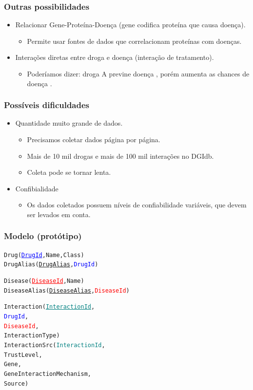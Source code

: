 \documentclass[12pt]{beamer}
\begin{document}
\begin{frame}
  \frametitle{Outras possibilidades}

  \begin{itemize}
    \item Relacionar Gene-Proteína-Doença (gene codifica proteína que causa doença).
          \begin{itemize}
            \item Permite usar fontes de dados que correlacionam proteínas com doenças.
          \end{itemize}
    \item Interações diretas entre droga e doença (interação de tratamento).
          \begin{itemize}
            \item Poderíamos dizer: droga A previne doença \textalpha, porém
                  aumenta as chances de doença \textgamma.
          \end{itemize}
  \end{itemize}
\end{frame}

\begin{frame}
  \frametitle{Possíveis dificuldades}

  \begin{itemize}
    \item Quantidade muito grande de dados.
          \begin{itemize}
            \item Precisamos coletar dados página por página.
            \item Mais de 10 mil drogas e mais de 100 mil interações no DGIdb.
            \item Coleta pode se tornar lenta.
          \end{itemize}
    \item Confibialidade
          \begin{itemize}
            \item Os dados coletados possuem níveis de confiabilidade
            variáveis, que devem ser levados em conta.
          \end{itemize}
  \end{itemize}
\end{frame}

\begin{frame}[fragile]
  \frametitle{Modelo (protótipo)}

  \begin{alltt}
    Drug(\textcolor{blue}{\underline{DrugId}}, Name, Class)
    DrugAlias(\underline{DrugAlias}, \textcolor{blue}{DrugId})

    Disease(\textcolor{red}{\underline{DiseaseId}}, Name)
    DiseaseAlias(\underline{DiseaseAlias}, \textcolor{red}{DiseaseId})

    Interaction(\textcolor{teal}{\underline{InteractionId}},
                \textcolor{blue}{DrugId},
                \textcolor{red}{DiseaseId},
                InteractionType)
    InteractionSrc(\textcolor{teal}{InteractionId},
                   TrustLevel,
                   Gene,
                   GeneInteractionMechanism,
                   Source)
  \end{alltt}
\end{frame}
\end{document}
